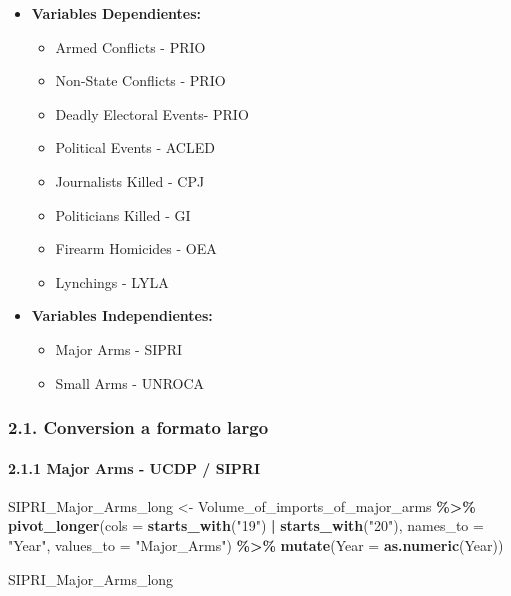 \documentclass[
  11pt,
]{article}
\newenvironment{Shaded}{\begin{snugshade}}{\end{snugshade}}
\newcommand{\AttributeTok}[1]{\textcolor[rgb]{0.13,0.29,0.53}{#1}}
\newcommand{\FunctionTok}[1]{\textcolor[rgb]{0.13,0.29,0.53}{\textbf{#1}}}
\newcommand{\NormalTok}[1]{#1}
\newcommand{\OtherTok}[1]{\textcolor[rgb]{0.56,0.35,0.01}{#1}}
\newcommand{\SpecialCharTok}[1]{\textcolor[rgb]{0.81,0.36,0.00}{\textbf{#1}}}
\newcommand{\StringTok}[1]{\textcolor[rgb]{0.31,0.60,0.02}{#1}}
\begin{document}
\begin{itemize}
\item
  \textbf{Variables Dependientes:}

  \begin{itemize}
  \item
    Armed Conflicts - PRIO
  \item
    Non-State Conflicts - PRIO
  \item
    Deadly Electoral Events- PRIO
  \item
    Political Events - ACLED
  \item
    Journalists Killed - CPJ
  \item
    Politicians Killed - GI
  \item
    Firearm Homicides - OEA
  \item
    Lynchings - LYLA
  \end{itemize}
\item
  \textbf{Variables Independientes:}

  \begin{itemize}
  \item
    Major Arms - SIPRI
  \item
    Small Arms - UNROCA
  \end{itemize}
\end{itemize}

\subsubsection{2.1. Conversion a formato
largo}\label{conversion-a-formato-largo}

\paragraph{2.1.1 Major Arms - UCDP /
SIPRI}\label{major-arms---ucdp-sipri}

\begin{Shaded}
\begin{Highlighting}[]
\NormalTok{SIPRI\_Major\_Arms\_long }\OtherTok{\textless{}{-}}\NormalTok{ Volume\_of\_imports\_of\_major\_arms }\SpecialCharTok{\%\textgreater{}\%}
  \FunctionTok{pivot\_longer}\NormalTok{(}\AttributeTok{cols =} \FunctionTok{starts\_with}\NormalTok{(}\StringTok{"19"}\NormalTok{) }\SpecialCharTok{|} \FunctionTok{starts\_with}\NormalTok{(}\StringTok{"20"}\NormalTok{), }
               \AttributeTok{names\_to =} \StringTok{"Year"}\NormalTok{, }\AttributeTok{values\_to =} \StringTok{"Major\_Arms"}\NormalTok{) }\SpecialCharTok{\%\textgreater{}\%}
  \FunctionTok{mutate}\NormalTok{(}\AttributeTok{Year =} \FunctionTok{as.numeric}\NormalTok{(Year))}

\NormalTok{SIPRI\_Major\_Arms\_long}
\end{Highlighting}
\end{Shaded}
\end{document}

